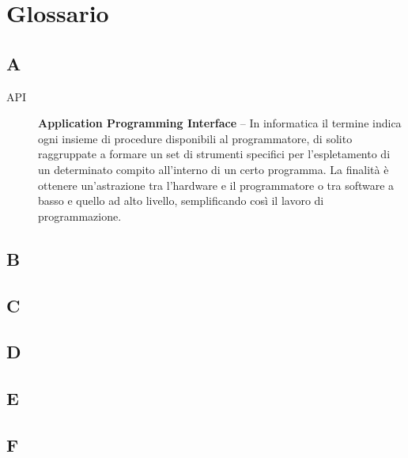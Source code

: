 \cleardoublepage
\chapter*{Glossario}




\section*{A}
\begin{description}
\item[API] \textbf{Application Programming Interface} -- In informatica il termine indica ogni insieme di procedure disponibili al programmatore, di solito raggruppate a formare un set di strumenti specifici per l'espletamento di un determinato compito all'interno di un certo programma. La finalità è ottenere un'astrazione tra l'hardware e il programmatore o tra software a basso e quello ad alto livello, semplificando così il lavoro di programmazione.


\end{description}


\section*{B}


\section*{C}


\section*{D}


\section*{E}


\section*{F}


